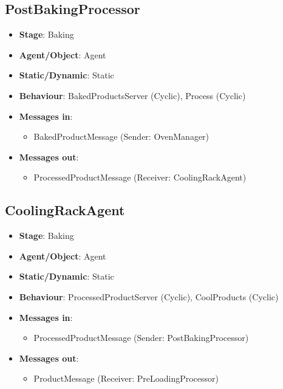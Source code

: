 \documentclass[12pt]{article}
\begin{document}
\subsection{PostBakingProcessor}
\begin{itemize}
    \item \textbf{Stage}: Baking
    \item \textbf{Agent/Object}: Agent 
    \item \textbf{Static/Dynamic}: Static
    \item \textbf{Behaviour}: BakedProductsServer (Cyclic), Process (Cyclic)
    \item \textbf{Messages in}:
        \begin{itemize}
            \item  BakedProductMessage (Sender: OvenManager)
        \end{itemize}
    \item \textbf{Messages out}:
        \begin{itemize}
            \item  ProcessedProductMessage (Receiver: CoolingRackAgent)
        \end{itemize}
\end{itemize}

\subsection{CoolingRackAgent}
\begin{itemize}
    \item \textbf{Stage}: Baking
    \item \textbf{Agent/Object}: Agent
    \item \textbf{Static/Dynamic}: Static
    \item \textbf{Behaviour}: ProcessedProductServer (Cyclic), CoolProducts (Cyclic)
    \item \textbf{Messages in}:
        \begin{itemize}
            \item ProcessedProductMessage (Sender: PostBakingProcessor)
        \end{itemize}
    \item \textbf{Messages out}:
        \begin{itemize}
            \item ProductMessage (Receiver: PreLoadingProcessor)
        \end{itemize}
\end{itemize}
\newpage{}
\end{document}
